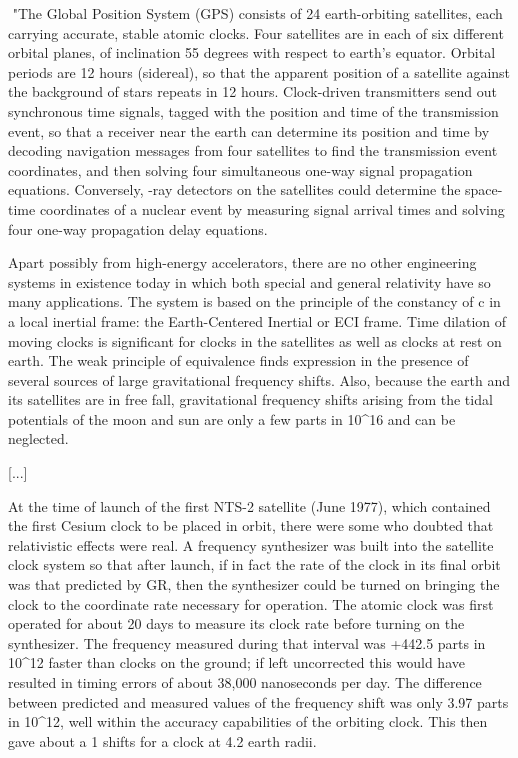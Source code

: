 $$
"The Global Position System (GPS) consists of 24 earth-orbiting
satellites, each carrying accurate, stable atomic clocks.  Four
satellites are in each of six different orbital planes, of inclination
55 degrees with respect to earth's equator.  Orbital periods are 12
hours (sidereal), so that the apparent position of a satellite against
the background of stars repeats in 12 hours.  Clock-driven
transmitters send out synchronous time signals, tagged with the
position and time of the transmission event, so that a receiver near
the earth can determine its position and time by decoding navigation
messages from four satellites to find the transmission event
coordinates, and then solving four simultaneous one-way signal
propagation equations.  Conversely, \gamma -ray detectors on the
satellites could determine the space-time coordinates of a nuclear
event by measuring signal arrival times and solving four one-way
propagation delay equations.

Apart possibly from high-energy accelerators, there are no other
engineering systems in existence today in which both special and
general relativity have so many applications.  The system is based on
the principle of the constancy of c in a local inertial frame: the
Earth-Centered Inertial or ECI frame.  Time dilation of moving clocks
is significant for clocks in the satellites as well as clocks at rest
on earth.  The weak principle of equivalence finds expression in the
presence of several sources of large gravitational frequency
shifts.  Also, because the earth and its satellites are in free fall,
gravitational frequency shifts arising from the tidal potentials of
the moon and sun are only a few parts in 10^16 and can be neglected.

[...]

At the time of launch of the first NTS-2 satellite (June 1977), which
contained the first Cesium clock to be placed in orbit, there were
some who doubted that relativistic effects were real.  A frequency
synthesizer was built into the satellite clock system so that after
launch, if in fact the rate of the clock in its final orbit was that
predicted by GR, then the synthesizer could be turned on bringing the
clock to the coordinate rate necessary for operation.  The atomic
clock was first operated for about 20 days to measure its clock rate
before turning on the synthesizer.  The frequency measured during that
interval was +442.5 parts in 10^12 faster than clocks on the ground;
if left uncorrected this would have resulted in timing errors of about
38,000 nanoseconds per day. The difference between predicted and
measured values of the frequency shift was only 3.97 parts in 10^12,
well within the accuracy capabilities of the orbiting clock.  This then
gave about a 1%
shifts for a clock at 4.2 earth radii.

